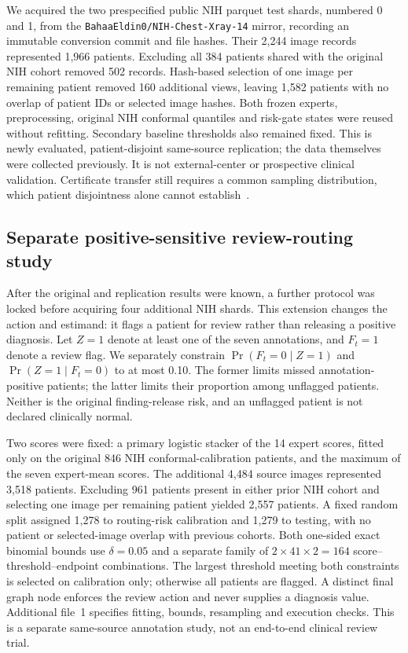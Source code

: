 \documentclass[10pt,a4paper]{article}
\begin{document}
We acquired the two prespecified public NIH parquet test shards, numbered 0 and 1, from the \texttt{BahaaEldin0/NIH-Chest-Xray-14} mirror, recording an immutable conversion commit and file hashes. Their 2,244 image records represented 1,966 patients. Excluding all 384 patients shared with the original NIH cohort removed 502 records. Hash-based selection of one image per remaining patient removed 160 additional views, leaving 1,582 patients with no overlap of patient IDs or selected image hashes. Both frozen experts, preprocessing, original NIH conformal quantiles and risk-gate states were reused without refitting. Secondary baseline thresholds also remained fixed. This is newly evaluated, patient-disjoint same-source replication; the data themselves were collected previously. It is not external-center or prospective clinical validation. Certificate transfer still requires a common sampling distribution, which patient disjointness alone cannot establish~\cite{zech2018variable,tibshirani2019covariate}.

\subsection{Separate positive-sensitive review-routing study}
After the original and replication results were known, a further protocol was locked before acquiring four additional NIH shards. This extension changes the action and estimand: it flags a patient for review rather than releasing a positive diagnosis. Let $Z=1$ denote at least one of the seven annotations, and $F_t=1$ denote a review flag. We separately constrain $\Pr(F_t=0\mid Z=1)$ and $\Pr(Z=1\mid F_t=0)$ to at most 0.10. The former limits missed annotation-positive patients; the latter limits their proportion among unflagged patients. Neither is the original finding-release risk, and an unflagged patient is not declared clinically normal.

Two scores were fixed: a primary logistic stacker of the 14 expert scores, fitted only on the original 846 NIH conformal-calibration patients, and the maximum of the seven expert-mean scores. The additional 4,484 source images represented 3,518 patients. Excluding 961 patients present in either prior NIH cohort and selecting one image per remaining patient yielded 2,557 patients. A fixed random split assigned 1,278 to routing-risk calibration and 1,279 to testing, with no patient or selected-image overlap with previous cohorts. Both one-sided exact binomial bounds use $\delta=0.05$ and a separate family of $2\times41\times2=164$ score--threshold--endpoint combinations. The largest threshold meeting both constraints is selected on calibration only; otherwise all patients are flagged. A distinct final graph node enforces the review action and never supplies a diagnosis value. Additional file~1 specifies fitting, bounds, resampling and execution checks. This is a separate same-source annotation study, not an end-to-end clinical review trial.
\end{document}
